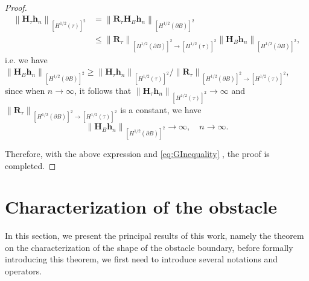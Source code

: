\documentclass[11pt,reqno,twoside]{amsart}
\theoremstyle{definition}
\theoremstyle{remark}
\numberwithin{equation}{section}
\begin{document}
\begin{proof}
\begin{equation}\begin{aligned}
\left\| \mathbf H_{\tau} \mathbf h_n \right\|_{\left[H^{1/2}\left(\tau \right) \right]^2 } 
&=\left\|\mathbf R_{\tau} \mathbf H_{B} \mathbf h_n \right\|_{\left[H^{1/2}\left(\partial B \right) \right]^2 } \\
& \leq \left\|\mathbf R_{\tau}\right\|_{\left[H^{1/2}\left(\partial B \right) \right]^2 \to \left[H^{1/2}\left(\tau \right) \right]^2 } \left\| \mathbf H_{B} \mathbf h_n \right\|_{\left[H^{1/2}\left(\partial B \right) \right]^2 } ,
\end{aligned}\end{equation}
i.e. we have $ \left\| \mathbf H_{B} \mathbf h_n \right\|_{\left[H^{1/2}\left(\partial B \right) \right]^2 } \geq \left\| \mathbf H_{\tau} \mathbf h_n \right\|_{\left[H^{1/2}\left(\tau \right) \right]^2 }  / \left\|\mathbf R_{\tau}\right\|_{\left[H^{1/2}\left(\partial B \right) \right]^2 \to \left[H^{1/2}\left(\tau \right) \right]^2 }$, since when $n \to \infty $,  it follows that $\left\| \mathbf H_{\tau} \mathbf h_n \right\|_{\left[H^{1/2}\left(\tau \right) \right]^2 } \to \infty $ and $\left\|\mathbf R_{\tau}\right\|_{\left[H^{1/2}\left(\partial B \right) \right]^2 \to \left[H^{1/2}\left(\tau \right) \right]^2 }$ is a constant, we have
$$
\left\| \mathbf H_{B} \mathbf h_n \right\|_{\left[H^{1/2}\left(\partial B \right) \right]^2 } \to \infty ,\quad n\to\infty.
$$

Therefore, with the above expression and \eqref{eq:GInequality} , the proof is completed.
\end{proof}








\section{Characterization of the obstacle}\label{sec:Characterization of the obstacle}

In this section, we present the principal results of this work, namely the theorem on the characterization of the shape of the obstacle boundary, before formally introducing this theorem, we first need to introduce several notations and operators.
\end{document}
